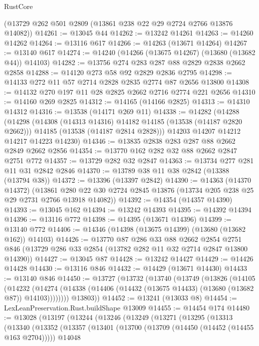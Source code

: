 \begin{lexlean}{RustCore}
\begin{coremodule}
    (@13729 @262 @501 @2809 (@13861 @238 @22 @29 @2724 @2766 @13876 @14082))
@14261 := @13045 @44
@14262 := @13242 @14261
@14263 := @14260 @14262
@14264 := @13116 @617
@14266 := @14263 (@13671 @14264)
@14267 := @13140 @617
@14274 := @14240 (@14266 (@13675 @14267) (@13680 (@13682 @44)) @14103)
@14282 := @13756 @274 @283 @287 @88 @2829 @2838 @2662 @2858
@14288 := @14120 @273 @58 @92 @2829 @2836 @2795
@14298 := @14133 @272 @11 @57 @2714 @2828 @2835 @2774 @87 @2656 @13800
@14308 := @14132 @270 @197 @11 @28 @2825 @2662 @2716 @2774 @221 @2656
@14310 := @14160 @269 @2825
@14312 := @14165 (@14166 @2825)
@14313 := @14310 @14312
@14316 := @13538 (@14171 @269 @11)
@14338 := @14282
    (@14288
      (@14298
        (@14308 (@14313 @14316) @14182 @14185 (@13538 (@14187 @2820 @2662)))
        @14185
        (@13538 (@14187 @2814 @2828)))
      @14203
      @14207
      @14212
      @14217
      @14223
      @14230)
@14346 := @13835 @2838 @283 @287 @88 @2662 @2849 @2662 @2856
@14354 := @13770 @162 @282 @32 @88 @2662 @2847 @2751 @772
@14357 := @13729 @282 @32 @2847
@14363 := @13734 @277 @281 @11 @31 @2842 @2846
@14370 := @13789 @38 @11 @38 @2842 (@13388 (@13794 @38))
@14372 := @13396 (@13397 @2842)
@14390 := @14363
    (@14370 @14372)
    (@13861 @280 @22 @30 @2724 @2845 @13876 (@13734 @205 @238 @25 @29 @2731 @2766 @13918 @14082))
@14392 := @14354 (@14357 @14390)
@14393 := @13045 @162
@14394 := @13242 @14393
@14395 := @14392 @14394
@14396 := @13116 @772
@14398 := @14395 (@13671 @14396)
@14399 := @13140 @772
@14406 := @14346 (@14398 (@13675 @14399) (@13680 (@13682 @162)) @14103)
@14426 := @13770
    @87
    @286
    @33
    @88
    @2662
    @2854
    @2751
    @846
    (@13729 @286 @33 @2854 (@13782 @282 @11 @32 @2714 @2847 @13800 @14390))
@14427 := @13045 @87
@14428 := @13242 @14427
@14429 := @14426 @14428
@14430 := @13116 @846
@14432 := @14429 (@13671 @14430)
@14433 := @13140 @846
@14450 := @13727
    (@13732
      (@13740
        (@13749
          (@13826
            (@14105
              (@14232
                (@14274 (@14338 (@14406 (@14432 (@13675 @14433) (@13680 (@13682 @87)) @14103))))))))
        @13803))
@14452 := @13241 (@13033 @8)
@14454 := LexLeanPreservation.Rust.buildShape @13009
@14455 := @14454 @174
@14480 := @13028
    (@13197
      (@13244
        (@13246
          (@13249
            (@13271
              (@13295
                (@13313
                  (@13340
                    (@13352
                      (@13357
                        (@13401
                          (@13700 (@13709 (@14450 (@14452 (@14455 @163 @2704)))))
                          @14048

\end{coremodule}
\end{lexlean}
